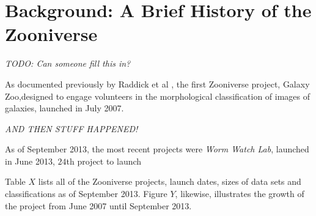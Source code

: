 \documentclass{sigchi}
\begin{document}
\section{Background: A Brief History of the Zooniverse}

\emph{TODO: Can someone fill this in?}

As documented previously by Raddick et al \cite{raddick}, the first
Zooniverse project, Galaxy Zoo,designed to engage volunteers in the
morphological classification of images of galaxies, launched in July
2007\cite{galaxyzoo-launch}. 

\emph{AND THEN STUFF HAPPENED!}  

As of September 2013, the most recent projects were \emph{Worm Watch
  Lab}, launched in June 2013, $24$th project to launch

Table $X$ lists all of the Zooniverse projects, launch dates, sizes of
data sets and classifications as of September 2013.  Figure $Y$,
likewise, illustrates the growth of the project from June 2007 until
September 2013.
\end{document}

